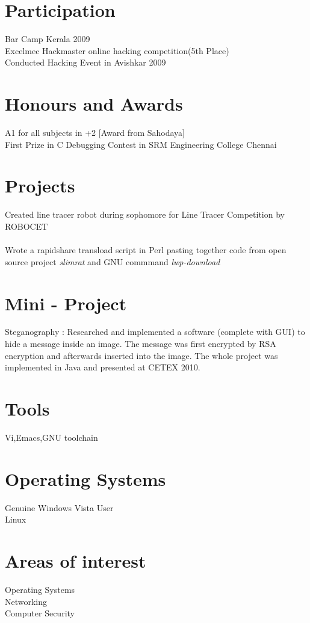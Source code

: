 \documentclass[line,margin]{res}
\begin{document}
\begin{resume}
\section{Participation}
Bar Camp Kerala 2009\\
Excelmec Hackmaster online hacking competition(5th Place)\\
Conducted Hacking Event in Avishkar 2009\\


\section{Honours and Awards}
A1 for all subjects in +2  [Award from Sahodaya]\\
First Prize in C Debugging Contest in SRM Engineering College Chennai

\section{Projects}
Created line tracer robot during sophomore for Line Tracer Competition by ROBOCET\\\\
Wrote a rapidshare transload script in Perl pasting together code from open source project {\it slimrat} and GNU commmand {\it lwp-download}
\section{Mini - Project}
Steganography : Researched and implemented a software (complete with GUI) to hide a message inside an image. The message was first encrypted by RSA encryption and afterwards inserted into the image. The whole project was implemented in Java and presented at CETEX 2010.

\section{Tools}
Vi,Emacs,GNU toolchain

\section{Operating Systems}
Genuine Windows Vista User\\
Linux

\section{Areas of interest}
Operating Systems\\
Networking\\
Computer Security\\


\end{resume}
\end{document}
